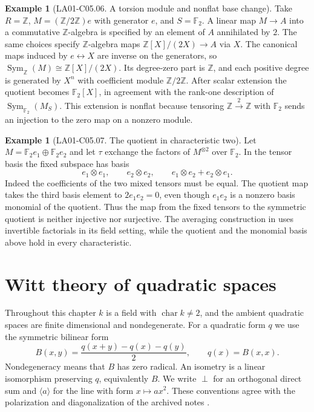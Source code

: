 \documentclass[11pt,oneside,openany]{book}
\theoremstyle{definition}
\newtheorem{example}[theorem]{Example}
\theoremstyle{remark}
\begin{document}
\begin{example}[LA01-C05.06. A torsion module and nonflat base change]
\label{ex:la01-symmetric-torsion}
Take \(R=\mathbb Z\), \(M=(\mathbb Z/2\mathbb Z)e\) with generator
\(e\), and \(S=\mathbb F_2\). A linear map \(M\to A\) into a
commutative \(\mathbb Z\)-algebra is specified by an element of
\(A\) annihilated by \(2\). The same choices specify
\(\mathbb Z\)-algebra maps \(\mathbb Z[X]/(2X)\to A\) via \(X\).
The canonical maps induced by \(e\leftrightarrow X\) are inverse
on the generators, so
\(\operatorname{Sym}_{\mathbb Z}(M)\cong\mathbb Z[X]/(2X)\).
Its degree-zero part is \(\mathbb Z\), and each positive degree
is generated by \(X^n\) with coefficient module \(\mathbb Z/2\mathbb Z\).
After scalar extension the quotient becomes \(\mathbb F_2[X]\),
in agreement with the rank-one description of
\(\operatorname{Sym}_{\mathbb F_2}(M_S)\).
This extension is nonflat because tensoring
\(\mathbb Z\xrightarrow{\,2\,}\mathbb Z\) with \(\mathbb F_2\)
sends an injection to the zero map on a nonzero module.
\end{example}

\begin{example}[LA01-C05.07. The quotient in characteristic two]
\label{ex:la01-symmetric-char-two}
Let \(M=\mathbb F_2 e_1\oplus\mathbb F_2 e_2\) and let \(\tau\)
exchange the factors of \(M^{\otimes 2}\) over \(\mathbb F_2\).
In the tensor basis the fixed subspace has basis
\[
  e_1\otimes e_1,\qquad e_2\otimes e_2,\qquad
  e_1\otimes e_2+e_2\otimes e_1.
\]
Indeed the coefficients of the two mixed tensors must be equal.
The quotient map takes the third basis element to
\(2e_1e_2=0\), even though \(e_1e_2\) is a nonzero basis monomial
of the quotient. Thus the map from the fixed tensors to the
symmetric quotient is neither injective nor surjective. The
averaging construction in \cite[entry 15.normalization]{d05}
uses invertible factorials in its field setting, while the
quotient and the monomial basis above hold in every characteristic.
\end{example}
\chapter{Witt theory of quadratic spaces}
\label{ch:la01-witt}

Throughout this chapter \(k\) is a field with
\(\operatorname{char} k\ne 2\), and the ambient quadratic spaces are
finite dimensional and nondegenerate. For a quadratic form \(q\) we
use the symmetric bilinear form
\[
  B(x,y)=\frac{q(x+y)-q(x)-q(y)}{2},
  \qquad q(x)=B(x,x).
\]
Nondegeneracy means that \(B\) has zero radical. An isometry is a
linear isomorphism preserving \(q\), equivalently \(B\). We write
\(\perp\) for an orthogonal direct sum and \(\langle a\rangle\) for
the line with form \(x\mapsto ax^2\). These conventions agree with
the polarization and diagonalization of the archived notes
\cite[11.polarization and 11.diagonal\_congruence]{d05}.
\end{document}
